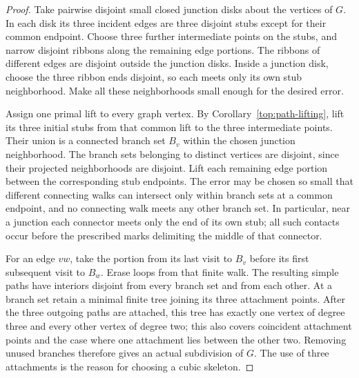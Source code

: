 \begin{proof}
Take pairwise disjoint small closed junction disks about the vertices
of $G$.  In each disk its three incident edges are three disjoint stubs
except for their common endpoint.  Choose three further intermediate
points on the stubs, and narrow disjoint ribbons along the remaining
edge portions.  The ribbons of different edges are disjoint outside
the junction disks.  Inside a junction disk, choose the three ribbon
ends disjoint, so each meets only its own stub neighborhood.  Make
all these neighborhoods small enough for the desired error.

Assign one primal lift to every graph vertex.  By
Corollary~\ref{top:path-lifting}, lift its three initial stubs from
that common lift to the three intermediate points.  Their union is a
connected branch set $B_v$ within the chosen junction neighborhood.
The branch sets belonging to distinct vertices are disjoint, since
their projected neighborhoods are disjoint.  Lift each remaining
edge portion between the corresponding stub endpoints.  The error
may be chosen so small that different connecting walks can intersect
only within branch sets at a common endpoint, and no connecting walk
meets any other branch set.  In particular, near a junction each
connector meets only the end of its own stub; all such contacts occur
before the prescribed marks delimiting the middle of that connector.

For an edge $vw$, take the portion from its last visit to $B_v$
before its first subsequent visit to $B_w$.  Erase loops from that
finite walk.  The resulting simple paths have interiors disjoint
from every branch set and from each other.  At a branch set retain
a minimal finite tree joining its three attachment points.  After
the three outgoing paths are attached, this tree has exactly one
vertex of degree three and every other vertex of degree two; this
also covers coincident attachment points and the case where one
attachment lies between the other two.  Removing unused branches
therefore gives an actual subdivision of $G$.  The use of three
attachments is the reason for choosing a cubic skeleton.


\end{proof}
